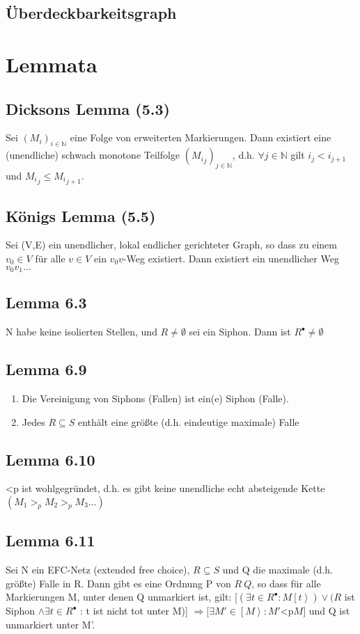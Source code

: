 \documentclass[12pt]{scrreprt}
\begin{document}
\section{Überdeckbarkeitsgraph}

\chapter{Lemmata}
\section{Dicksons Lemma (5.3)}
Sei ${(M_i)}_{i \in \mathbb{N}}$ eine Folge von erweiterten Markierungen. Dann existiert eine (unendliche) schwach monotone Teilfolge $({M_i}_j)_{j \in \mathbb{N}}$, d.h. $\forall j \in \mathbb{N}$ gilt $i_j < i_{j+1}$ und ${M_i}_j \le {M_i}_{j+1}$.

\section{Königs Lemma (5.5)}
Sei (V,E) ein unendlicher, lokal endlicher gerichteter Graph, so dass zu einem $v_0 \in V$ für alle $v \in V$ ein $v_0 v$-Weg existiert. Dann existiert ein unendlicher Weg $v_0 v_1 ...$

\section{Lemma 6.3}
N habe keine isolierten Stellen, und $R \not = \emptyset$ sei ein Siphon. Dann ist $R^\bullet \not = \emptyset$

\section{Lemma 6.9}
\begin{enumerate}
	\item Die Vereinigung von Siphons (Fallen) ist ein(e) Siphon (Falle).
	\item Jedes $R \subseteq S$ enthält eine größte (d.h. eindeutige maximale) Falle
\end{enumerate}

\section{Lemma 6.10}
\ac{<p} ist wohlgegründet, d.h. es gibt keine unendliche echt absteigende Kette $(M_1 >_p M_2 >_p M_3 ...)$

\section{Lemma 6.11}
Sei N ein EFC-Netz (extended free choice), $R \subseteq S$ und Q die maximale (d.h. größte) Falle in R. Dann gibt es eine Ordnung P von $R \ Q$, so dass für alle Markierungen M, unter denen Q unmarkiert ist, gilt:\newline
$[(\exists t \in R^\bullet : M\left[t\right>) \vee (R$ ist Siphon $\wedge \exists t \in R^\bullet$ : t ist nicht tot unter M)] $\Rightarrow [ \exists M' \in \left[M\right> : M' $\ac{<p}$M]$ und Q ist unmarkiert unter M'.
\end{document}
